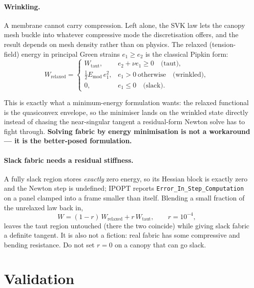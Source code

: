 \documentclass[11pt,a4paper]{article}
\newcommand{\code}[1]{\texttt{\small #1}}
\begin{document}
\paragraph{Wrinkling.} A membrane cannot carry compression. Left alone, the SVK
law lets the canopy mesh buckle into whatever compressive mode the
discretisation offers, and the result depends on mesh density rather than on
physics. The relaxed (tension-field) energy in principal Green strains
$e_1 \ge e_2$ is the classical Pipkin form:
\begin{equation}
  W_{\text{relaxed}} =
  \begin{cases}
    W_{\text{taut}}, & e_2 + \nu e_1 \ge 0 \quad\text{(taut)},\\[2pt]
    \tfrac{1}{2}E_{\text{mod}}\,e_1^2, & e_1 > 0 \ \text{otherwise}\quad\text{(wrinkled)},\\[2pt]
    0, & e_1 \le 0 \quad\text{(slack)}.
  \end{cases}
\end{equation}

This is exactly what a minimum-energy formulation wants: the relaxed functional
is the quasiconvex envelope, so the minimiser lands on the wrinkled state
directly instead of chasing the near-singular tangent a residual-form Newton
solve has to fight through. \textbf{Solving fabric by energy minimisation is not
a workaround --- it is the better-posed formulation.}

\paragraph{Slack fabric needs a residual stiffness.} A fully slack region stores
\emph{exactly} zero energy, so its Hessian block is exactly zero and the Newton
step is undefined; IPOPT reports \code{Error\_In\_Step\_Computation} on a panel
clamped into a frame smaller than itself. Blending a small fraction of the
unrelaxed law back in,
\begin{equation}
  W = (1-r)\,W_{\text{relaxed}} + r\,W_{\text{taut}}, \qquad r = 10^{-4},
\end{equation}
leaves the taut region untouched (there the two coincide) while giving slack
fabric a definite tangent. It is also not a fiction: real fabric has some
compressive and bending resistance. Do not set $r=0$ on a canopy that can go
slack.

\section{Validation}
\label{sec:validation}
\end{document}
